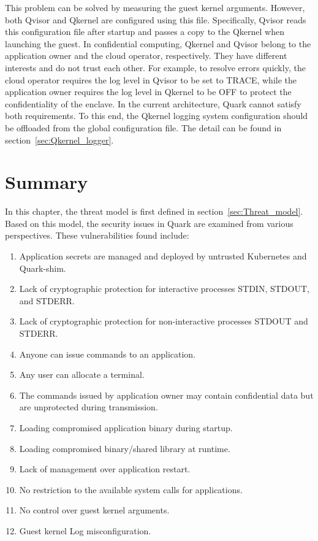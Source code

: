 This problem can be solved by measuring the guest kernel arguments. However, both Qvisor and Qkernel are configured using this file. Specifically, Qvisor reads this configuration file after startup and passes a copy to the Qkernel when launching the guest. In confidential 
computing, Qkernel and Qvisor belong to the application owner and the cloud operator, respectively. They have different interests and do not trust each other. For example, to resolve errors quickly, the cloud operator requires the log level in Qvisor to be set to TRACE, while the application owner 
requires the log level in Qkernel to be OFF to protect the confidentiality of the enclave. In the current architecture, Quark cannot satisfy both requirements. To this end, the Qkernel logging system configuration should be offloaded from the global configuration 
file. The detail can be found in section~\ref{sec:Qkernel_logger}.




\section{Summary}
In this chapter, the threat model is first defined in section~\ref{sec:Threat_model}. Based on this model, the security issues in Quark are examined from various perspectives. These vulnerabilities found include:
\begin{enumerate}
  \item \label{vulnerabilities:1} Application secrets are managed and deployed by untrusted Kubernetes and Quark-shim.
  \item \label{vulnerabilities:2} Lack of cryptographic protection for interactive processes STDIN, STDOUT, and STDERR.
  \item \label{vulnerabilities:3} Lack of cryptographic protection for non-interactive processes STDOUT and STDERR.
  \item \label{vulnerabilities:4} Anyone can issue commands to an application.
  \item \label{vulnerabilities:5} Any user can allocate a terminal.
  \item \label{vulnerabilities:6} The commands issued by application owner may contain confidential data but are unprotected during transmission.
  \item \label{vulnerabilities:7} Loading compromised application binary during startup.
  \item \label{vulnerabilities:8} Loading compromised binary/shared library at runtime.
  \item \label{vulnerabilities:9}  Lack of management over application restart.
  \item \label{vulnerabilities:10} No restriction to the available system calls for applications.
  \item \label{vulnerabilities:11} No control over guest kernel arguments.
  \item \label{vulnerabilities:12} Guest kernel Log misconfiguration.

\end{enumerate}

